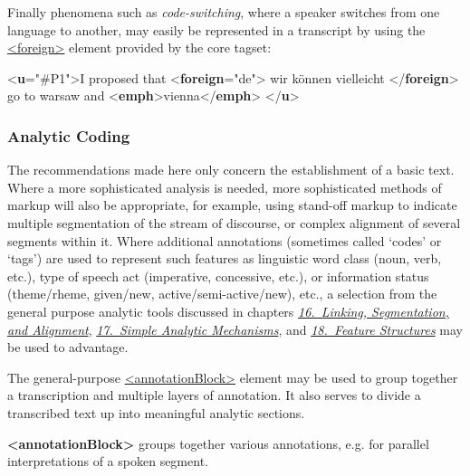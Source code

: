 Finally phenomena such as \textit{code-switching}, where a speaker switches from one language to another, may easily be represented in a transcript by using the \hyperref[TEI.foreign]{<foreign>} element provided by the core tagset: \par\bgroup{}\exampleFont \begin{shaded}\noindent\mbox{}{<\textbf{u}\hspace*{1em}{who}="{\#P1}">}I proposed that {<\textbf{foreign}\hspace*{1em}{xml:lang}="{de}">} wir können\mbox{}\newline 
{} vielleicht {</\textbf{foreign}>} go to warsaw\mbox{}\newline 
 and {<\textbf{emph}>}vienna{</\textbf{emph}>}\mbox{}\newline 
{</\textbf{u}>}\end{shaded}\egroup\par \noindent  
\subsubsection[{Analytic Coding}]{Analytic Coding}\label{TSTPAC}\par
The recommendations made here only concern the establishment of a basic text. Where a more sophisticated analysis is needed, more sophisticated methods of markup will also be appropriate, for example, using stand-off markup to indicate multiple segmentation of the stream of discourse, or complex alignment of several segments within it. Where additional annotations (sometimes called ‘codes’ or ‘tags’) are used to represent such features as linguistic word class (noun, verb, etc.), type of speech act (imperative, concessive, etc.), or information status (theme/rheme, given/new, active/semi-active/new), etc., a selection from the general purpose analytic tools discussed in chapters \textit{\hyperref[SA]{16.\ Linking, Segmentation, and Alignment}}, \textit{\hyperref[AI]{17.\ Simple Analytic Mechanisms}}, and \textit{\hyperref[FS]{18.\ Feature Structures}} may be used to advantage.\par
The general-purpose \hyperref[TEI.annotationBlock]{<annotationBlock>} element may be used to group together a transcription and multiple layers of annotation. It also serves to divide a transcribed text up into meaningful analytic sections. 
\begin{sansreflist}
  
\item [\textbf{<annotationBlock>}] groups together various annotations, e.g. for parallel interpretations of a spoken segment.
\end{sansreflist}

